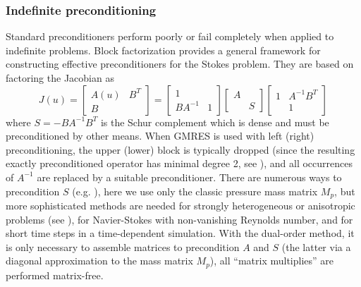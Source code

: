 \subsubsection{Indefinite preconditioning}
Standard preconditioners perform poorly or fail completely when applied to indefinite problems.  Block factorization
provides a general framework for constructing effective preconditioners for the Stokes problem.  They are based on
factoring the Jacobian as
\begin{equation}\label{eq:schur}
  J(u) = \begin{bmatrix} A(u) & B^T \\ B & \end{bmatrix} =
  \begin{bmatrix} 1 & \\ BA^{-1} & 1 \end{bmatrix}
  \begin{bmatrix} A & \\ & S \end{bmatrix}
  \begin{bmatrix} 1 & A^{-1}B^T \\ & 1 \end{bmatrix}
\end{equation}
where $S = -BA^{-1}B^T$ is the Schur complement which is dense and must be preconditioned by other means.  When GMRES is
used with left (right) preconditioning, the upper (lower) block is typically dropped (since the resulting exactly
preconditioned operator has minimal degree 2, see \cite{murphy2000npi}), and all occurrences of $A^{-1}$ are replaced by
a suitable preconditioner.  There are numerous ways to precondition $S$ (e.g. \cite{benzi2005nss,elman2008tcp}), here we
use only the classic pressure mass matrix $M_p$, but more sophisticated methods are needed for strongly heterogeneous or
anisotropic problems (see \cite{may2008pim}), for Navier-Stokes with non-vanishing Reynolds number, and for short time
steps in a time-dependent simulation.  With the dual-order method, it is only necessary to assemble matrices to
precondition $A$ and $S$ (the latter via a diagonal approximation to the mass matrix $M_p$), all ``matrix multiplies''
are performed matrix-free.

